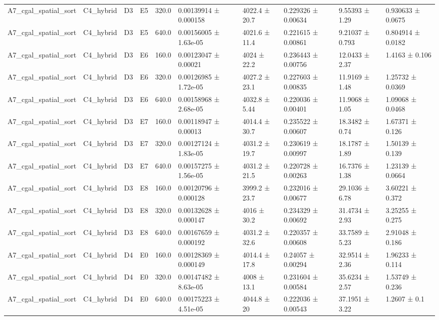 \begin{table}
\begin{tabular}{llllllllll}
A7\_cgal\_spatial\_sort & C4\_hybrid & D3 & E5 & 320.0 & 0.00139914 ± 0.000158 & 4022.4 ± 20.7 & 0.229326 ± 0.00634 & 9.55393 ± 1.29 & 0.930633 ± 0.0675 \\
A7\_cgal\_spatial\_sort & C4\_hybrid & D3 & E5 & 640.0 & 0.00156005 ± 1.63e-05 & 4021.6 ± 11.4 & 0.221615 ± 0.00861 & 9.21037 ± 0.793 & 0.804914 ± 0.0182 \\
A7\_cgal\_spatial\_sort & C4\_hybrid & D3 & E6 & 160.0 & 0.00123047 ± 0.00021 & 4024 ± 22.2 & 0.236443 ± 0.00756 & 12.0433 ± 2.37 & 1.4163 ± 0.106 \\
A7\_cgal\_spatial\_sort & C4\_hybrid & D3 & E6 & 320.0 & 0.00126985 ± 1.72e-05 & 4027.2 ± 23.1 & 0.227603 ± 0.00835 & 11.9169 ± 1.48 & 1.25732 ± 0.0369 \\
A7\_cgal\_spatial\_sort & C4\_hybrid & D3 & E6 & 640.0 & 0.00158968 ± 2.68e-05 & 4032.8 ± 5.44 & 0.220036 ± 0.00401 & 11.9068 ± 1.05 & 1.09068 ± 0.0468 \\
A7\_cgal\_spatial\_sort & C4\_hybrid & D3 & E7 & 160.0 & 0.00118947 ± 0.00013 & 4014.4 ± 30.7 & 0.235522 ± 0.00607 & 18.3482 ± 0.74 & 1.67371 ± 0.126 \\
A7\_cgal\_spatial\_sort & C4\_hybrid & D3 & E7 & 320.0 & 0.00127124 ± 1.83e-05 & 4031.2 ± 19.7 & 0.230619 ± 0.00997 & 18.1787 ± 1.89 & 1.50139 ± 0.139 \\
A7\_cgal\_spatial\_sort & C4\_hybrid & D3 & E7 & 640.0 & 0.00157275 ± 1.56e-05 & 4031.2 ± 21.5 & 0.220728 ± 0.00263 & 16.7376 ± 1.38 & 1.23139 ± 0.0664 \\
A7\_cgal\_spatial\_sort & C4\_hybrid & D3 & E8 & 160.0 & 0.00120796 ± 0.000128 & 3999.2 ± 23.7 & 0.232016 ± 0.00677 & 29.1036 ± 6.78 & 3.60221 ± 0.372 \\
A7\_cgal\_spatial\_sort & C4\_hybrid & D3 & E8 & 320.0 & 0.00132628 ± 0.000147 & 4016 ± 30.2 & 0.234329 ± 0.00692 & 31.4734 ± 2.93 & 3.25255 ± 0.275 \\
A7\_cgal\_spatial\_sort & C4\_hybrid & D3 & E8 & 640.0 & 0.00167659 ± 0.000192 & 4031.2 ± 32.6 & 0.220357 ± 0.00608 & 33.7589 ± 5.23 & 2.91048 ± 0.186 \\
A7\_cgal\_spatial\_sort & C4\_hybrid & D4 & E0 & 160.0 & 0.00128369 ± 0.000149 & 4014.4 ± 17.8 & 0.24057 ± 0.00294 & 32.9514 ± 2.36 & 1.96233 ± 0.114 \\
A7\_cgal\_spatial\_sort & C4\_hybrid & D4 & E0 & 320.0 & 0.00147482 ± 8.63e-05 & 4008 ± 13.1 & 0.231604 ± 0.00584 & 35.6234 ± 2.57 & 1.53749 ± 0.236 \\
A7\_cgal\_spatial\_sort & C4\_hybrid & D4 & E0 & 640.0 & 0.00175223 ± 4.51e-05 & 4044.8 ± 20 & 0.222036 ± 0.00543 & 37.1951 ± 3.22 & 1.2607 ± 0.1 \\

\end{tabular}
\end{table}
